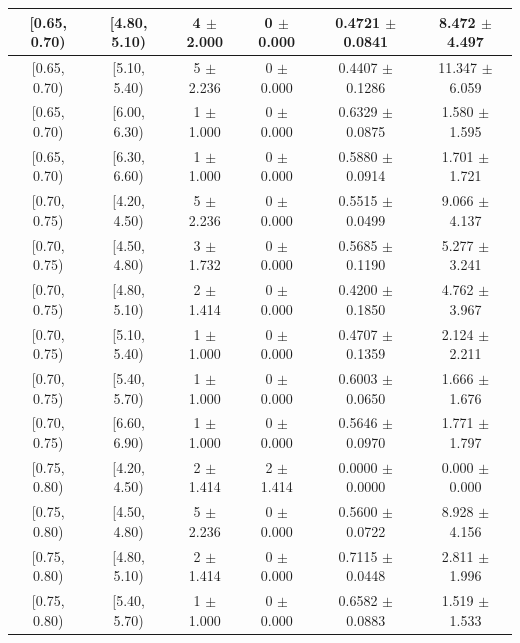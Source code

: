 \begin{longtable}{|c|c|c|c|c|c|}
\hline
[0.65, 0.70) & [4.80, 5.10) & 4 $\pm$ 2.000 & 0 $\pm$ 0.000 & 0.4721 $\pm$ 0.0841 & 8.472 $\pm$ 4.497 \\ 
\hline
[0.65, 0.70) & [5.10, 5.40) & 5 $\pm$ 2.236 & 0 $\pm$ 0.000 & 0.4407 $\pm$ 0.1286 & 11.347 $\pm$ 6.059 \\ 
\hline
[0.65, 0.70) & [6.00, 6.30) & 1 $\pm$ 1.000 & 0 $\pm$ 0.000 & 0.6329 $\pm$ 0.0875 & 1.580 $\pm$ 1.595 \\ 
\hline
[0.65, 0.70) & [6.30, 6.60) & 1 $\pm$ 1.000 & 0 $\pm$ 0.000 & 0.5880 $\pm$ 0.0914 & 1.701 $\pm$ 1.721 \\ 
\hline
[0.70, 0.75) & [4.20, 4.50) & 5 $\pm$ 2.236 & 0 $\pm$ 0.000 & 0.5515 $\pm$ 0.0499 & 9.066 $\pm$ 4.137 \\ 
\hline
[0.70, 0.75) & [4.50, 4.80) & 3 $\pm$ 1.732 & 0 $\pm$ 0.000 & 0.5685 $\pm$ 0.1190 & 5.277 $\pm$ 3.241 \\ 
\hline
[0.70, 0.75) & [4.80, 5.10) & 2 $\pm$ 1.414 & 0 $\pm$ 0.000 & 0.4200 $\pm$ 0.1850 & 4.762 $\pm$ 3.967 \\ 
\hline
[0.70, 0.75) & [5.10, 5.40) & 1 $\pm$ 1.000 & 0 $\pm$ 0.000 & 0.4707 $\pm$ 0.1359 & 2.124 $\pm$ 2.211 \\ 
\hline
[0.70, 0.75) & [5.40, 5.70) & 1 $\pm$ 1.000 & 0 $\pm$ 0.000 & 0.6003 $\pm$ 0.0650 & 1.666 $\pm$ 1.676 \\ 
\hline
[0.70, 0.75) & [6.60, 6.90) & 1 $\pm$ 1.000 & 0 $\pm$ 0.000 & 0.5646 $\pm$ 0.0970 & 1.771 $\pm$ 1.797 \\ 
\hline
[0.75, 0.80) & [4.20, 4.50) & 2 $\pm$ 1.414 & 2 $\pm$ 1.414 & 0.0000 $\pm$ 0.0000 & 0.000 $\pm$ 0.000 \\ 
\hline
[0.75, 0.80) & [4.50, 4.80) & 5 $\pm$ 2.236 & 0 $\pm$ 0.000 & 0.5600 $\pm$ 0.0722 & 8.928 $\pm$ 4.156 \\ 
\hline
[0.75, 0.80) & [4.80, 5.10) & 2 $\pm$ 1.414 & 0 $\pm$ 0.000 & 0.7115 $\pm$ 0.0448 & 2.811 $\pm$ 1.996 \\ 
\hline
[0.75, 0.80) & [5.40, 5.70) & 1 $\pm$ 1.000 & 0 $\pm$ 0.000 & 0.6582 $\pm$ 0.0883 & 1.519 $\pm$ 1.533 \\ 
\hline
\end{longtable}
